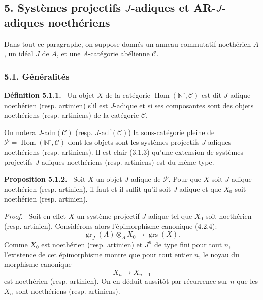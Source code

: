 \documentclass[11pt]{article}
\newenvironment{statement}[1]{\par\medskip\noindent\textbf{#1.}\ }{\par\medskip}
\newenvironment{prooftext}[1][Proof]{\par\noindent\emph{#1.}\ }{\par\medskip}
\DeclareMathOperator{\Hom}{Hom}
\providecommand{\gr}{\operatorname{gr}}
\providecommand{\Hom}{\operatorname{Hom}}
\providecommand{\gr}{\operatorname{gr}}
\providecommand{\gr}{\operatorname{gr}}
\providecommand{\grs}{\operatorname{grs}}
\begin{document}
\subsection*{5. Systèmes projectifs \(J\)-adiques et AR-\(J\)-adiques noethériens}

Dans tout ce paragraphe, on suppose donnés un anneau commutatif noethérien \(A\), un idéal \(J\) de \(A\), et une \(A\)-catégorie abélienne \(\mathcal C\).

\subsubsection*{5.1. Généralités}

\begin{statement}{Définition 5.1.1}
Un objet \(X\) de la catégorie \(\Hom(\mathbb N^\circ,\mathcal C)\) est dit \(J\)-adique noethérien (resp. artinien) s'il est \(J\)-adique et si ses composantes sont des objets noethériens (resp. artiniens) de la catégorie \(\mathcal C\).
\end{statement}

On notera \(J\)-adn\((\mathcal C)\) (resp. \(J\)-adf\((\mathcal C)\)) la sous-catégorie pleine de
\(\mathcal P=\Hom(\mathbb N^\circ,\mathcal C)\) dont les objets sont les systèmes projectifs \(J\)-adiques noethériens (resp. artiniens). Il est clair (3.1.3) qu'une extension de systèmes projectifs \(J\)-adiques noethériens (resp. artiniens) est du même type.

\begin{statement}{Proposition 5.1.2}
Soit \(X\) un objet \(J\)-adique de \(\mathcal P\). Pour que \(X\) soit \(J\)-adique noethérien (resp. artinien), il faut et il suffit qu'il soit \(J\)-adique et que \(X_0\) soit noethérien (resp. artinien).
\end{statement}

\begin{prooftext}
Soit en effet \(X\) un système projectif \(J\)-adique tel que \(X_0\) soit noethérien (resp. artinien). Considérons alors l'épimorphisme canonique (4.2.4):
\[
\gr_J(A)\otimes_A X_0\longrightarrow \grs(X).
\]
Comme \(X_0\) est noethérien (resp. artinien) et \(J^n\) de type fini pour tout \(n\), l'existence de cet épimorphisme montre que pour tout entier \(n\), le noyau du morphisme canonique
\[
X_n\longrightarrow X_{n-1}
\]
est noethérien (resp. artinien). On en déduit aussitôt par récurrence sur \(n\) que les \(X_n\) sont noethériens (resp. artiniens).
\end{prooftext}
\end{document}
